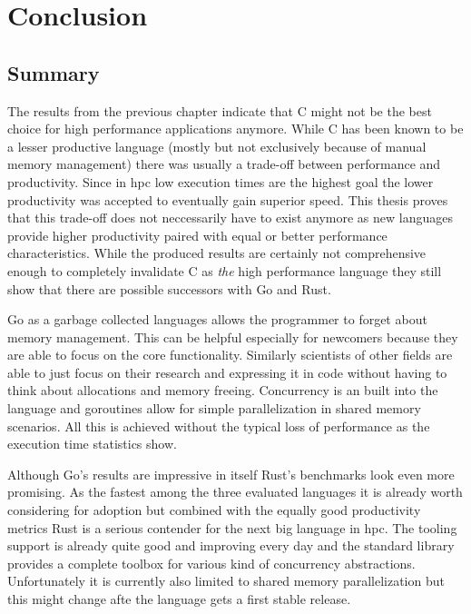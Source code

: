 \chapter{Conclusion}
\label{ch:Conclusion}


\section{Summary}
\label{sec:Conclusion::Summary}

The results from the previous chapter indicate that C might not be the best choice for high performance applications anymore. While C has been known to be a lesser productive language (mostly but not exclusively because of manual memory management) there was usually a trade-off between performance and productivity. Since in \gls{hpc} low execution times are the highest goal the lower productivity was accepted to eventually gain superior speed. This thesis proves that this trade-off does not neccessarily have to exist anymore as new languages provide higher productivity paired with equal or better performance characteristics. While the produced results are certainly not comprehensive enough to completely invalidate C as \textit{the} high performance language they still show that there are possible successors with Go and Rust.

Go as a garbage collected languages allows the programmer to forget about memory management. This can be helpful especially for newcomers because they are able to focus on the core functionality. Similarly scientists of other fields are able to just focus on their research and expressing it in code without having to think about allocations and memory freeing. Concurrency is an built into the language and \glspl{goroutine} allow for simple parallelization in shared memory scenarios. All this is achieved without the typical loss of performance as the execution time statistics show.

Although Go's results are impressive in itself Rust's benchmarks look even more promising. As the fastest among the three evaluated languages it is already worth considering for adoption but combined with the equally good productivity metrics Rust is a serious contender for the next big language in \acrlong{hpc}. The tooling support is already quite good and improving every day and the standard library provides a complete toolbox for various kind of concurrency abstractions. Unfortunately it is currently also limited to shared memory parallelization but this might change afte the language gets a first stable release.

